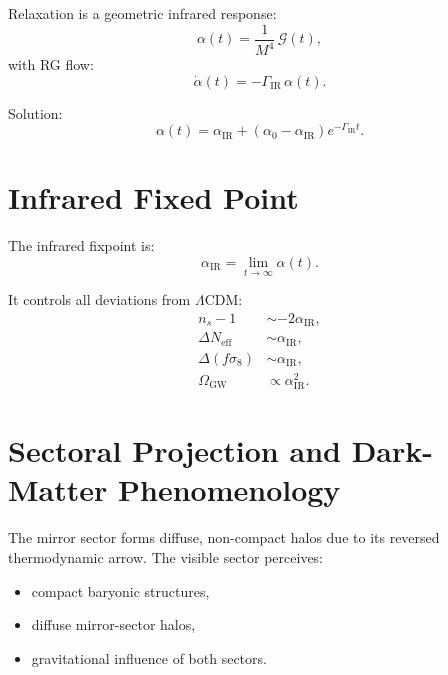 \documentclass[11pt,a4paper]{article}
\begin{document}
Relaxation is a geometric infrared response:
\begin{equation}
\alpha(t) = \frac{1}{M^4}\,\mathcal{G}(t),
\end{equation}
with RG flow:
\begin{equation}
\dot{\alpha}(t) = -\Gamma_{\mathrm{IR}}\,\alpha(t).
\end{equation}

Solution:
\begin{equation}
\alpha(t)
=
\alpha_{\mathrm{IR}}
+
(\alpha_0 - \alpha_{\mathrm{IR}}) e^{-\Gamma_{\mathrm{IR}} t}.
\end{equation}

\section{Infrared Fixed Point}

The infrared fixpoint is:
\begin{equation}
\alpha_{\mathrm{IR}} = \lim_{t\to\infty} \alpha(t).
\end{equation}

It controls all deviations from $\Lambda$CDM:
\begin{align}
n_s - 1 &\sim -2\alpha_{\mathrm{IR}}, \\
\Delta N_{\mathrm{eff}} &\sim \alpha_{\mathrm{IR}}, \\
\Delta(f\sigma_8) &\sim \alpha_{\mathrm{IR}}, \\
\Omega_{\mathrm{GW}} &\propto \alpha_{\mathrm{IR}}^2.
\end{align}

\section{Sectoral Projection and Dark-Matter Phenomenology}

The mirror sector forms diffuse, non-compact halos due to its reversed
thermodynamic arrow. The visible sector perceives:
\begin{itemize}[leftmargin=0.8cm]
  \item compact baryonic structures,
  \item diffuse mirror-sector halos,
  \item gravitational influence of both sectors.
\end{itemize}
\end{document}
